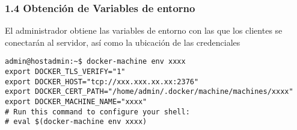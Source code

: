 \documentclass[ucs]{beamer}
\begin{document}
\begin{frame}[fragile]
\frametitle{1.4 Obtención de Variables de entorno}
El administrador obtiene las variables de entorno con las que los clientes
se conectarán al servidor, así como la ubicación de las credenciales

  \begin{scriptsize}
  \begin{verbatim}
admin@hostadmin:~$ docker-machine env xxxx
export DOCKER_TLS_VERIFY="1"
export DOCKER_HOST="tcp://xxx.xxx.xx.xx:2376"
export DOCKER_CERT_PATH="/home/admin/.docker/machine/machines/xxxx"
export DOCKER_MACHINE_NAME="xxxx"
# Run this command to configure your shell: 
# eval $(docker-machine env xxxx)
  \end{verbatim}
  \end{scriptsize}
\end{frame}
\end{document}
